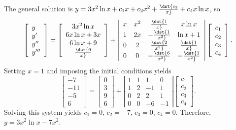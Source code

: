 \documentclass[dvips]{book}
\numberwithin{example}{section}
\numberwithin{equation}{section}
\numberwithin{theorem}{section}
\numberwithin{table}{section}
\numberwithin{figure}{section}
\begin{document}
The general solution is $y=3x^2\ln x+c_1x+c_2x^2+\dst{c_3\over x}
+c_4x\ln x$, so
$$
\left[\begin{array}{l}y\\y'\\y''\\y'''
\end{array}\right]=
\left[\begin{array}{c}
3x^2\ln x\\6x\ln x+3x\\6\ln x+9\\\dst{6\over x}
\end{array}\right]+
\left|\begin{array}{cccc}
x&x^2&\dst{1\over x}&x\ln x\\1&2x&-\dst{1\over x^2}&\ln x+1\\
0&2&\dst{2\over x^3}&\dst{1\over x}\\0&0&-\dst{6\over
x^2}&-\dst{1\over x^2}
\end{array}\right|
\left[\begin{array}{c}
c_1\\c_2\\c_3\\c_4
\end{array}\right].
$$
Setting $x=1$ and imposing the initial conditions yields
$$
\left[\begin{array}{c}
-7\\-11\\-5\\6
\end{array}\right]=
\left[\begin{array}{r}
0\\3\\9\\6
\end{array}\right]+
\left|\begin{array}{rrrr}1&1&1&0\\1&2&-1&1
\\0&2&2&1\\0&0&-6&-1\end{array}\right|
\left[\begin{array}{c}
c_1\\c_2\\c_3\\c_4
\end{array}\right].
$$
Solving this system yields $c_1=0$, $c_2=-7$, $c_3=0$, $c_4=0$.
Therefore,
 $y=3x^2\ln x-7x^2$.
\end{document}
